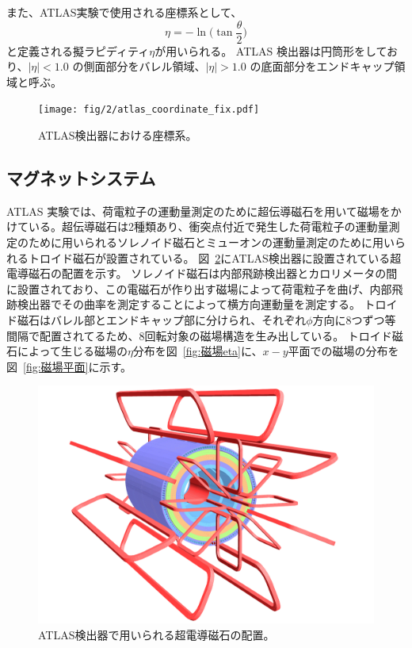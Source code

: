 また、ATLAS実験で使用される座標系として、
\begin{equation}
　\eta=-\ln\bigg(\tan\frac{\theta}{2}\bigg)
　\label{ラピディティ}
\end{equation}
と定義される擬ラピディティ$\eta$が用いられる。
ATLAS 検出器は円筒形をしており、$|\eta| < 1.0$ の側面部分をバレル領域、$|\eta| > 1.0$ の底面部分をエンドキャップ領域と呼ぶ。

\begin{figure}[tb]
  \centering
  \texttt{[image: fig/2/atlas\_coordinate\_fix.pdf]}
  \caption{ATLAS検出器における座標系。}
  \label{fig:a}
\end{figure}

\newpage
\subsection{マグネットシステム}\label{magnetic_filed}
ATLAS 実験では、荷電粒子の運動量測定のために超伝導磁石を用いて磁場をかけている。超伝導磁石は2種類あり、衝突点付近で発生した荷電粒子の運動量測定のために用いられるソレノイド磁石とミューオンの運動量測定のために用いられるトロイド磁石が設置されている。
図~\ref{fig:磁石}にATLAS検出器に設置されている超電導磁石の配置を示す。
ソレノイド磁石は内部飛跡検出器とカロリメータの間に設置されており、この電磁石が作り出す磁場によって荷電粒子を曲げ、内部飛跡検出器でその曲率を測定することによって横方向運動量を測定する。
トロイド磁石はバレル部とエンドキャップ部に分けられ、それぞれ$\phi$方向に8つずつ等間隔で配置されてるため、8回転対象の磁場構造を生み出している。
トロイド磁石によって生じる磁場の$\eta$分布を図~\ref{fig:磁場eta}に、$x-y$平面での磁場の分布を図~\ref{fig:磁場平面}に示す。


\begin{figure}[tb]
  \centering
  \includegraphics[clip, width=14cm]{fig/2/ATLcoilGeom.pdf}
  \caption{ATLAS検出器で用いられる超電導磁石の配置\cite{Aad:1129811}。}
  \label{fig:磁石}
\end{figure}

